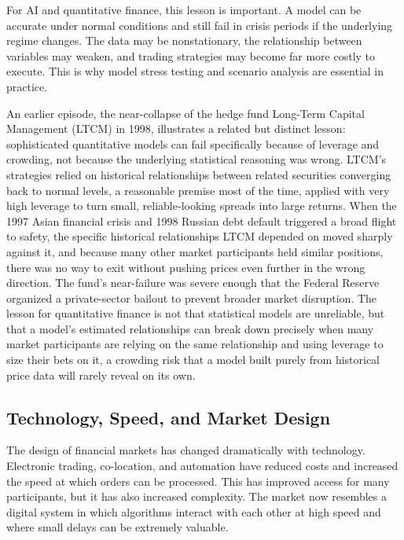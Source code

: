 \documentclass[../ai_in_finance]{subfiles}
\begin{document}
For AI and quantitative finance, this lesson is important. A model can be accurate under normal conditions and still fail in crisis periods if the underlying regime changes. The data may be nonstationary, the relationship between variables may weaken, and trading strategies may become far more costly to execute. This is why model stress testing and scenario analysis are essential in practice.

An earlier episode, the near-collapse of the hedge fund Long-Term Capital Management (LTCM) in 1998, illustrates a related but distinct lesson: sophisticated quantitative models can fail specifically because of leverage and crowding, not because the underlying statistical reasoning was wrong. LTCM's strategies relied on historical relationships between related securities converging back to normal levels, a reasonable premise most of the time, applied with very high leverage to turn small, reliable-looking spreads into large returns.
When the 1997 Asian financial crisis and 1998 Russian debt default triggered a broad flight to safety, the specific historical relationships LTCM depended on moved sharply against it, and because many other market participants held similar positions, there was no way to exit without pushing prices even further in the wrong direction. The fund's near-failure was severe enough that the Federal Reserve organized a private-sector bailout to prevent broader market disruption. The lesson for quantitative finance is not that statistical models are unreliable, but that a model's estimated relationships can break down precisely when many market participants are relying on the same relationship and using leverage to size their bets on it, a crowding risk that a model built purely from historical price data will rarely reveal on its own.

\subsection{Technology, Speed, and Market Design}

The design of financial markets has changed dramatically with technology. Electronic trading, co-location, and automation have reduced costs and increased the speed at which orders can be processed. This has improved access for many participants, but it has also increased complexity. The market now resembles a digital system in which algorithms interact with each other at high speed and where small delays can be extremely valuable.
\end{document}
